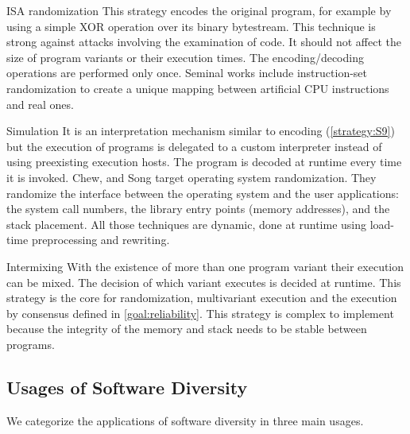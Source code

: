 \begin{strategy}{ISA randomization}
    \label{strategy:S8}
    \normalfont
    This strategy encodes the original program, for example by using a simple XOR operation over its binary bytestream. This technique is strong against attacks involving the examination of code. It should not affect the size of program variants or their execution times. The encoding/decoding operations are performed only once. 
    Seminal works include instruction-set randomization \cite{Kc03,barrantes2003randomized}
    to create a unique mapping between artificial CPU instructions and real ones.
\end{strategy}


\begin{strategy}{Simulation}
    \label{strategy:S9}
    \normalfont
    It is an interpretation mechanism similar to encoding (\autoref{strategy:S9}) but the execution of programs is delegated to a custom interpreter instead of using preexisting execution hosts. The program is decoded at runtime every time it is invoked. 
    Chew, and Song \cite{Chew02mitigatingbuffer} target operating system randomization. They randomize the interface between the operating system and the user applications:
    the system call numbers, the library entry points (memory addresses), and the stack placement. All those techniques are dynamic, done at runtime using load-time preprocessing and rewriting. 
\end{strategy}


\begin{strategy}{Intermixing}
    \label{strategy:S10}
    \normalfont
    With the existence of more than one program variant their execution can be mixed. The decision of which variant executes is decided at runtime. This strategy is the core for randomization, multivariant execution and the execution by consensus defined in \autoref{goal:reliability}. This strategy is 
    complex to implement because the integrity of the memory and stack needs to be stable between programs.
\end{strategy}

\subsection*{Usages of Software Diversity}

We categorize the applications of software diversity in three main usages.

